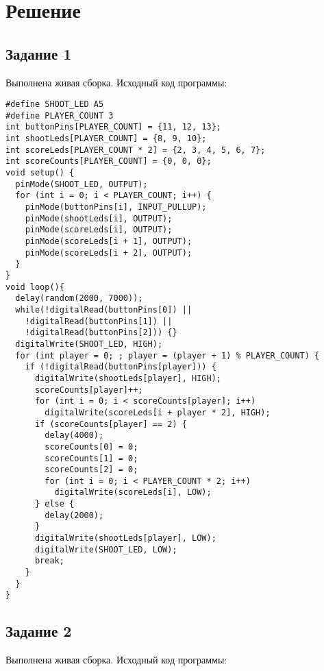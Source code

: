\documentclass[a4paper,14pt]{extarticle}
\begin{document}
  \newpage
  \section*{\hspace{12.5mm}Решение}
  \subsection*{\hspace{12.5mm}Задание 1}
  Выполнена живая сборка. Исходный код программы:

  \begingroup
    \fontsize{14pt}{10pt}\selectfont
    \linespread{1}
    \begin{verbatim}
#define SHOOT_LED A5
#define PLAYER_COUNT 3
int buttonPins[PLAYER_COUNT] = {11, 12, 13};
int shootLeds[PLAYER_COUNT] = {8, 9, 10};
int scoreLeds[PLAYER_COUNT * 2] = {2, 3, 4, 5, 6, 7};
int scoreCounts[PLAYER_COUNT] = {0, 0, 0};
void setup() {
  pinMode(SHOOT_LED, OUTPUT);
  for (int i = 0; i < PLAYER_COUNT; i++) {
    pinMode(buttonPins[i], INPUT_PULLUP);
    pinMode(shootLeds[i], OUTPUT);
    pinMode(scoreLeds[i], OUTPUT);
    pinMode(scoreLeds[i + 1], OUTPUT);
    pinMode(scoreLeds[i + 2], OUTPUT);
  }
}
void loop(){
  delay(random(2000, 7000));
  while(!digitalRead(buttonPins[0]) || 
    !digitalRead(buttonPins[1]) || 
    !digitalRead(buttonPins[2])) {}
  digitalWrite(SHOOT_LED, HIGH);
  for (int player = 0; ; player = (player + 1) % PLAYER_COUNT) {
    if (!digitalRead(buttonPins[player])) {
      digitalWrite(shootLeds[player], HIGH);
      scoreCounts[player]++;
      for (int i = 0; i < scoreCounts[player]; i++)
        digitalWrite(scoreLeds[i + player * 2], HIGH);
      if (scoreCounts[player] == 2) {
        delay(4000);
        scoreCounts[0] = 0;
        scoreCounts[1] = 0;
        scoreCounts[2] = 0;
        for (int i = 0; i < PLAYER_COUNT * 2; i++)
          digitalWrite(scoreLeds[i], LOW);
      } else {
        delay(2000);
      }
      digitalWrite(shootLeds[player], LOW);
      digitalWrite(SHOOT_LED, LOW);
      break;
    }
  }
}
    \end{verbatim}
  \endgroup

  \subsection*{\hspace{12.5mm}Задание 2}
  Выполнена живая сборка. Исходный код программы:

  \begingroup
    \fontsize{14pt}{10pt}\selectfont
    \linespread{1}
    \begin{verbatim}
    \end{verbatim}
  \endgroup
\end{document}
